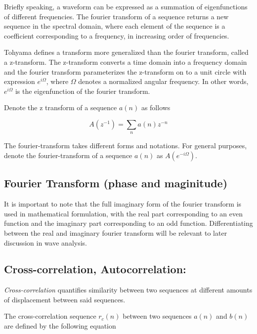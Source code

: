 \documentclass[12pt]{article}
\begin{document}
Briefly speaking, a waveform can be expressed as a summation of eigenfunctions of different frequencies. The fourier transform of a sequence returns a new sequence in the spectral domain, where each element of the sequence is a coefficient corresponding to a frequency, in increasing order of frequencies.\newline

Tohyama defines a transform more generalized than the fourier transform, called a z-transform.\citep{aa} The z-transform converts a time domain into a frequency domain and the fourier transform parameterizes the z-transform on to a unit circle with expression $e^{i\Omega}$, where $\Omega$ denotes a normalized angular frequency.\citep{aa} In other words, $e^{i\Omega}$ is the eigenfunction of the fourier transform.\newline

Denote the z transform of a sequence $a(n)$ as follows\citep{aa}

\begin{equation}
A(z^{-1}) = \sum\limits_{n} a(n)z^{-n} \label{z transform}
\end{equation}

The fourier-transform takes different forms and notations. For general purposes, denote the fourier-transform of a sequence $a(n)$ as  $A(e^{-i\Omega})$.



\subsection{Fourier Transform (phase and maginitude)}

It is important to note that the full imaginary form of the fourier transform is used in mathematical formulation, with the real part corresponding to an even function and the imaginary part corresponding to an odd function. Differentiating between the real and imaginary fourier transform will be relevant to later discussion in wave analysis.

\subsection{Cross-correlation, Autocorrelation:}

\textit{Cross-correlation} quantifies similarity between two sequences at different amounts of displacement between said sequences.\newline

The cross-correlation sequence $r_c(n)$ between two sequences $a(n)$ and $b(n)$ are defined by the following equation\citep{aa}
\end{document}

